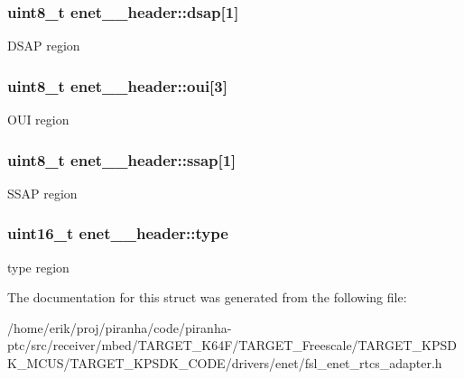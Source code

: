 \subsubsection[{\texorpdfstring{dsap}{dsap}}]{\setlength{\rightskip}{0pt plus 5cm}uint8\+\_\+t enet\+\_\+\_\+header\+::dsap\mbox{[}1\mbox{]}}\hypertarget{structenet__8022__header_a69a93d84b05e0adce0360fc71bbcc87d}{}\label{structenet__8022__header_a69a93d84b05e0adce0360fc71bbcc87d}
D\+S\+AP region 
\subsubsection[{\texorpdfstring{oui}{oui}}]{\setlength{\rightskip}{0pt plus 5cm}uint8\+\_\+t enet\+\_\+\_\+header\+::oui\mbox{[}3\mbox{]}}\hypertarget{structenet__8022__header_ad5e46845abf176af3bcd641210a2197d}{}\label{structenet__8022__header_ad5e46845abf176af3bcd641210a2197d}
O\+UI region 
\subsubsection[{\texorpdfstring{ssap}{ssap}}]{\setlength{\rightskip}{0pt plus 5cm}uint8\+\_\+t enet\+\_\+\_\+header\+::ssap\mbox{[}1\mbox{]}}\hypertarget{structenet__8022__header_aec71d6a509fbb2585c8750fdc8ec6abc}{}\label{structenet__8022__header_aec71d6a509fbb2585c8750fdc8ec6abc}
S\+S\+AP region 
\subsubsection[{\texorpdfstring{type}{type}}]{\setlength{\rightskip}{0pt plus 5cm}uint16\+\_\+t enet\+\_\+\_\+header\+::type}\hypertarget{structenet__8022__header_a2c60f1c282936065b25385df64c65929}{}\label{structenet__8022__header_a2c60f1c282936065b25385df64c65929}
type region 

The documentation for this struct was generated from the following file\+:\begin{DoxyCompactItemize}
\item 
/home/erik/proj/piranha/code/piranha-\/ptc/src/receiver/mbed/\+T\+A\+R\+G\+E\+T\+\_\+\+K64\+F/\+T\+A\+R\+G\+E\+T\+\_\+\+Freescale/\+T\+A\+R\+G\+E\+T\+\_\+\+K\+P\+S\+D\+K\+\_\+\+M\+C\+U\+S/\+T\+A\+R\+G\+E\+T\+\_\+\+K\+P\+S\+D\+K\+\_\+\+C\+O\+D\+E/drivers/enet/fsl\+\_\+enet\+\_\+rtcs\+\_\+adapter.\+h\end{DoxyCompactItemize}
